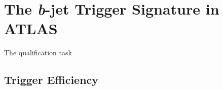 \chapter{The \emph{b}-jet Trigger Signature in ATLAS}
\label{ch:trigger}


	The qualification task
	
	\section{Trigger Efficiency}